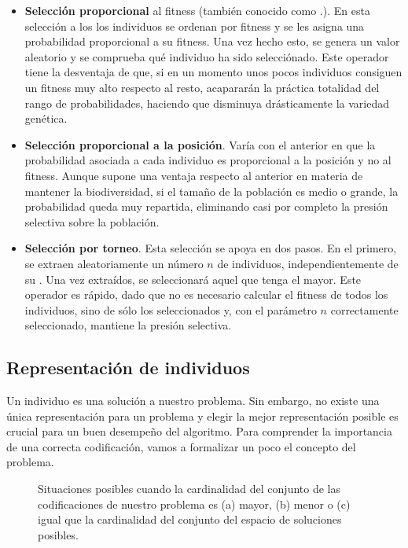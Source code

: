 \begin{itemize}
	\item \textbf{Selección proporcional} al fitness (también conocido como \textbf{}.). En esta selección a los los individuos se ordenan por fitness y se les asigna una probabilidad proporcional a su fitness. Una vez hecho esto, se genera un valor aleatorio y se comprueba qué individuo ha sido selecciónado. Este operador tiene la desventaja de que, si en un momento unos pocos individuos consiguen un fitness muy alto respecto al resto, acapararán la práctica totalidad del rango de probabilidades, haciendo que disminuya drásticamente la variedad genética.
	\item \textbf{Selección proporcional a la posición}. Varía con el anterior en que la probabilidad asociada a cada individuo es proporcional a la posición y no al fitness. Aunque supone una ventaja respecto al anterior en materia de mantener la biodiversidad, si el tamaño de la población es medio o grande, la probabilidad queda muy repartida, eliminando casi por completo la presión selectiva sobre la población.
	\item \textbf{Selección por torneo}. Esta selección se apoya en dos pasos. En el primero, se extraen aleatoriamente un número $n$ de individuos, independientemente de su \textit{}. Una vez extraídos, se seleccionará aquel que tenga el \textit{} mayor. Este operador es rápido, dado que no es necesario calcular el fitness de todos los individuos, sino de sólo los seleccionados y, con el parámetro $n$ correctamente seleccionado, mantiene la presión selectiva.
\end{itemize}

\subsection{Representación de individuos}

Un individuo es una solución a nuestro problema. Sin embargo, no existe una única representación para un problema y elegir la mejor representación posible es crucial para un buen desempeño del algoritmo. Para comprender la importancia de una correcta codificación, vamos a formalizar un poco el concepto del problema.

\begin{figure}
	\caption{Situaciones posibles cuando la cardinalidad del conjunto de las codificaciones de nuestro problema es (a) mayor, (b) menor o (c) igual que la cardinalidad del conjunto del espacio de soluciones posibles.}
	\label{fig:why-we-need-a-correct-codification}
\end{figure}


